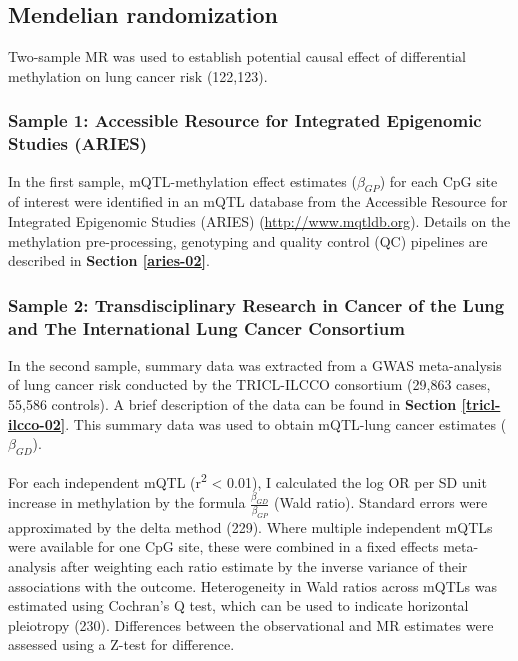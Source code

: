 \documentclass[11pt,oneside]{bristolthesis}
\begin{document}
\hypertarget{methods-mendelian-randomization-07}{%
\subsection{Mendelian randomization}\label{methods-mendelian-randomization-07}}

Two-sample MR was used to establish potential causal effect of differential methylation on lung cancer risk (122,123).

\hypertarget{sample-1-accessible-resource-for-integrated-epigenomic-studies-aries}{%
\subsubsection{Sample 1: Accessible Resource for Integrated Epigenomic Studies (ARIES)}\label{sample-1-accessible-resource-for-integrated-epigenomic-studies-aries}}

In the first sample, mQTL-methylation effect estimates (\(\beta_{GP}\)) for each CpG site of interest were identified in an mQTL database from the Accessible Resource for Integrated Epigenomic Studies (ARIES) (\url{http://www.mqtldb.org}). Details on the methylation pre-processing, genotyping and quality control (QC) pipelines are described in \textbf{Section \ref{aries-02}}.

\hypertarget{sample-2-transdisciplinary-research-in-cancer-of-the-lung-and-the-international-lung-cancer-consortium}{%
\subsubsection{Sample 2: Transdisciplinary Research in Cancer of the Lung and The International Lung Cancer Consortium}\label{sample-2-transdisciplinary-research-in-cancer-of-the-lung-and-the-international-lung-cancer-consortium}}

In the second sample, summary data was extracted from a GWAS meta-analysis of lung cancer risk conducted by the TRICL-ILCCO consortium (29,863 cases, 55,586 controls). A brief description of the data can be found in \textbf{Section \ref{tricl-ilcco-02}}. This summary data was used to obtain mQTL-lung cancer estimates (\(\beta_{GD}\)).

For each independent mQTL (r\textsuperscript{2} \textless{} 0.01), I calculated the log OR per SD unit increase in methylation by the formula \(\frac{\beta_{GD}} {\beta_{GP}}\) (Wald ratio). Standard errors were approximated by the delta method (229). Where multiple independent mQTLs were available for one CpG site, these were combined in a fixed effects meta-analysis after weighting each ratio estimate by the inverse variance of their associations with the outcome. Heterogeneity in Wald ratios across mQTLs was estimated using Cochran's Q test, which can be used to indicate horizontal pleiotropy (230). Differences between the observational and MR estimates were assessed using a Z-test for difference.
\end{document}

